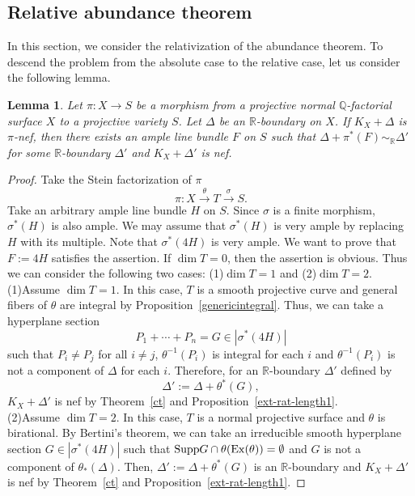 \documentclass[12pt,twoside]{amsart}
\newcommand{\Supp}[0]{{\operatorname{Supp}}}
\newtheorem{lem}[thm]{Lemma}
\theoremstyle{definition}
\begin{document}
\subsection{Relative abundance theorem}

In this section, 
we consider the relativization of the abundance theorem. 
To descend the problem from the absolute case to the relative case, 
let us consider the following lemma. 


\begin{lem}\label{relabundancelemma}
Let $\pi:X \to S$ be a morphism 
from a projective normal $\mathbb{Q}$-factorial surface $X$ 
to a projective variety $S$. 
Let $\Delta$ be an $\mathbb{R}$-boundary on $X$. 
If $K_X+\Delta$ is $\pi$-nef, 
then there exists an ample line bundle $F$ on $S$ such that 
$\Delta+\pi^*(F) \sim_{\mathbb{R}}\Delta'$ 
for some $\mathbb{R}$-boundary $\Delta'$
and $K_X+\Delta'$ is nef.
\end{lem}

\begin{proof}
Take the Stein factorization of $\pi$ 
$$\pi:X \overset{\theta}\to T \overset{\sigma}\to S.$$ 
Take an arbitrary ample line bundle $H$ on $S$. 
Since $\sigma$ is a finite morphism, 
$\sigma^*(H)$ is also ample. 
We may assume that $\sigma^*(H)$ is very ample 
by replacing $H$ with its multiple. 
Note that $\sigma^*(4H)$ is very ample. 
We want to prove that 
$F:=4H$ satisfies the assertion. 
If $\dim T=0$, then the assertion is obvious. 
Thus we can consider the following two cases: 
(1)$\dim T=1$ and (2)$\dim T=2$. \\
(1)Assume $\dim T=1$. 
In this case, $T$ is a smooth projective curve and 
general fibers of $\theta$ are integral 
by Proposition~\ref{genericintegral}. 
Thus, we can take a hyperplane section 
$$P_1+\cdots+P_n=G\in |\sigma^*(4H)|$$ such that 
$P_i\neq P_j$ for all $i\neq j$, 
$\theta^{-1}(P_i)$ is integral for each $i$ and 
$\theta^{-1}(P_i)$ is not a component of $\Delta$ for each $i$. 
Therefore, for an $\mathbb{R}$-boundary $\Delta'$ defined by 
$$\Delta':=\Delta+\theta^*(G),$$ 
$K_X+\Delta'$ is nef by Theorem~\ref{ct} and Proposition~\ref{ext-rat-length1}. \\
(2)Assume $\dim T=2$. 
In this case, $T$ is a normal projective surface and 
$\theta$ is birational. 
By Bertini's theorem, 
we can take an irreducible smooth hyperplane section 
$G\in |\sigma^*(4H)|$ such that 
$\Supp G\cap \theta({\rm Ex}(\theta))=\emptyset$ and 
$G$ is not a component of $\theta_*(\Delta)$. 
Then, $\Delta':=\Delta+\theta^*(G)$ is an $\mathbb{R}$-boundary and 
$K_X+\Delta'$ is nef by Theorem~\ref{ct} and Proposition~\ref{ext-rat-length1}.
\end{proof}
\end{document}
